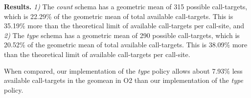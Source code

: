 \textbf{Results.}
\textit{1)}  The \textit{count} schema has a geometric mean of 315 possible call-targets, which is 22.29\% of the geometric mean of total available 
call-targets. This is 35.19\% more than the theoretical limit of available call-targets per call-site, and
\textit{2)}  The \textit{type} schema has a geometric mean of 290 possible call-targets, which is 20.52\% of the geometric mean of total available
call-targets. This is 38.09\% more than the theoretical limit of available call-targets per call-site.

When compared, our implementation of the \textit{type} policy allows about 7.93\% less available call-targets in the geomean in O2 than our implementation of the \textit{type} policy.


%
%	
%
%
%
